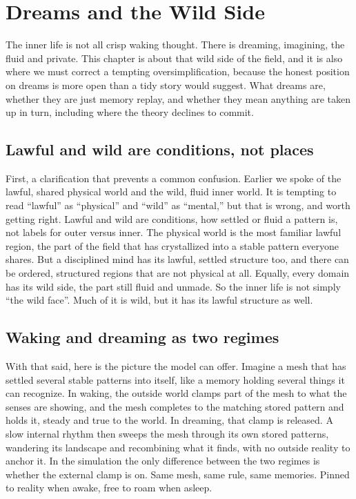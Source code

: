 \section{Dreams and the Wild Side}

The inner life is not all crisp waking thought. There is dreaming, imagining, the fluid and private. This chapter is about that wild side of the field, and it is also where we must correct a tempting oversimplification, because the honest position on dreams is more open than a tidy story would suggest. What dreams are, whether they are just memory replay, and whether they mean anything are taken up in turn, including where the theory declines to commit.

\subsection{Lawful and wild are conditions, not places}

First, a clarification that prevents a common confusion. Earlier we spoke of the lawful, shared physical world and the wild, fluid inner world. It is tempting to read ``lawful'' as ``physical'' and ``wild'' as ``mental,'' but that is wrong, and worth getting right. Lawful and wild are conditions, how settled or fluid a pattern is, not labels for outer versus inner. The physical world is the most familiar lawful region, the part of the field that has crystallized into a stable pattern everyone shares. But a disciplined mind has its lawful, settled structure too, and there can be ordered, structured regions that are not physical at all. Equally, every domain has its wild side, the part still fluid and unmade. So the inner life is not simply ``the wild face''. Much of it is wild, but it has its lawful structure as well.

\subsection{Waking and dreaming as two regimes}

With that said, here is the picture the model can offer. Imagine a mesh that has settled several stable patterns into itself, like a memory holding several things it can recognize. In waking, the outside world clamps part of the mesh to what the senses are showing, and the mesh completes to the matching stored pattern and holds it, steady and true to the world. In dreaming, that clamp is released. A slow internal rhythm then sweeps the mesh through its own stored patterns, wandering its landscape and recombining what it finds, with no outside reality to anchor it. In the simulation the only difference between the two regimes is whether the external clamp is on. Same mesh, same rule, same memories. Pinned to reality when awake, free to roam when asleep.

